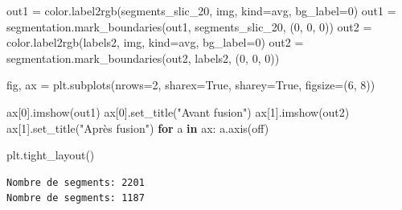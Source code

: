 \documentclass[
  11pt,
  letterpaper,
  open=any,
  twoside=false,
  french]{scrbook}
\newenvironment{Shaded}{\begin{snugshade}}{\end{snugshade}}
\newcommand{\ControlFlowTok}[1]{\textcolor[rgb]{0.00,0.23,0.31}{\textbf{#1}}}
\newcommand{\DecValTok}[1]{\textcolor[rgb]{0.68,0.00,0.00}{#1}}
\newcommand{\KeywordTok}[1]{\textcolor[rgb]{0.00,0.23,0.31}{\textbf{#1}}}
\newcommand{\NormalTok}[1]{\textcolor[rgb]{0.00,0.23,0.31}{#1}}
\newcommand{\OperatorTok}[1]{\textcolor[rgb]{0.37,0.37,0.37}{#1}}
\newcommand{\StringTok}[1]{\textcolor[rgb]{0.13,0.47,0.30}{#1}}
\newcommand{\VariableTok}[1]{\textcolor[rgb]{0.07,0.07,0.07}{#1}}
\begin{document}
\begin{Shaded}
\begin{Highlighting}[]
\NormalTok{out1 }\OperatorTok{=}\NormalTok{ color.label2rgb(segments\_slic\_20, img, kind}\OperatorTok{=}\StringTok{\textquotesingle{}avg\textquotesingle{}}\NormalTok{, bg\_label}\OperatorTok{=}\DecValTok{0}\NormalTok{)}
\NormalTok{out1 }\OperatorTok{=}\NormalTok{ segmentation.mark\_boundaries(out1, segments\_slic\_20, (}\DecValTok{0}\NormalTok{, }\DecValTok{0}\NormalTok{, }\DecValTok{0}\NormalTok{))}
\NormalTok{out2 }\OperatorTok{=}\NormalTok{ color.label2rgb(labels2, img, kind}\OperatorTok{=}\StringTok{\textquotesingle{}avg\textquotesingle{}}\NormalTok{, bg\_label}\OperatorTok{=}\DecValTok{0}\NormalTok{)}
\NormalTok{out2 }\OperatorTok{=}\NormalTok{ segmentation.mark\_boundaries(out2, labels2, (}\DecValTok{0}\NormalTok{, }\DecValTok{0}\NormalTok{, }\DecValTok{0}\NormalTok{))}

\NormalTok{fig, ax }\OperatorTok{=}\NormalTok{ plt.subplots(nrows}\OperatorTok{=}\DecValTok{2}\NormalTok{, sharex}\OperatorTok{=}\VariableTok{True}\NormalTok{, sharey}\OperatorTok{=}\VariableTok{True}\NormalTok{, figsize}\OperatorTok{=}\NormalTok{(}\DecValTok{6}\NormalTok{, }\DecValTok{8}\NormalTok{))}

\NormalTok{ax[}\DecValTok{0}\NormalTok{].imshow(out1)}
\NormalTok{ax[}\DecValTok{0}\NormalTok{].set\_title(}\StringTok{"Avant fusion"}\NormalTok{)}
\NormalTok{ax[}\DecValTok{1}\NormalTok{].imshow(out2)}
\NormalTok{ax[}\DecValTok{1}\NormalTok{].set\_title(}\StringTok{"Après fusion"}\NormalTok{)}
\ControlFlowTok{for}\NormalTok{ a }\KeywordTok{in}\NormalTok{ ax:}
\NormalTok{    a.axis(}\StringTok{\textquotesingle{}off\textquotesingle{}}\NormalTok{)}

\NormalTok{plt.tight\_layout()}
\end{Highlighting}
\end{Shaded}

\begin{verbatim}
Nombre de segments: 2201
Nombre de segments: 1187
\end{verbatim}
\end{document}
